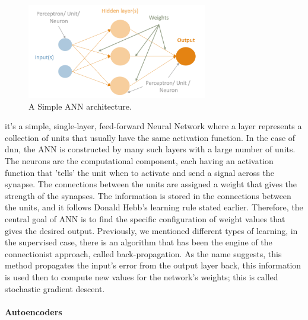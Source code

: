 \begin{figure}[!htb]
  \centering\includegraphics[width=0.7\textwidth,height=0.7\textheight,keepaspectratio]{Sections/Lit_review/Resources/Basic_ANN.png}
    \caption{A Simple ANN architecture. }
    \label{fig:ann_basic}
\end{figure}
\FloatBarrier

 it's a simple, single-layer, feed-forward Neural Network where a layer represents a collection of units that usually have the same activation function. In the case of \acrfull{dnn}, the ANN is constructed by many such layers with a large number of units. The neurons are the computational component, each having an activation function that 'tells' the unit when to activate and send a signal across the synapse. The connections between the units are assigned a weight that gives the strength of the synapses. The information is stored in the connections between the units, and it follows Donald Hebb's learning rule stated earlier. Therefore, the central goal of ANN is to find the specific configuration of weight values that gives the desired output. Previously, we mentioned different types of learning, in the supervised case, there is an algorithm that has been the engine of the connectionist approach, called back-propagation. As the name suggests, this method propagates the input's error from the output layer back, this information is used then to compute new values for the network's weights; this is called stochastic gradient descent.

\paragraph*{Autoencoders} \label{s:lit:autoencod_overview}

